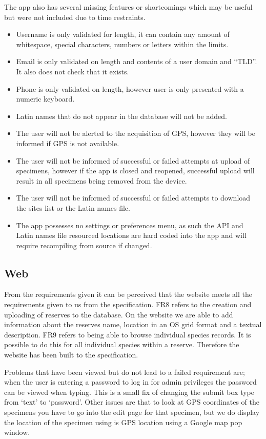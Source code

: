     The app also has several missing features or shortcomings which may be useful but were not included due to time restraints. 
    \begin{itemize}
        \item Username is only validated for length, it can contain any amount of whitespace, special characters, numbers or letters within the limits.
        \item Email is only validated on length and contents of a user domain and ``TLD''. It also does not check that it exists.
        \item Phone is only validated on length, however user is only presented with a numeric keyboard.
        \item Latin names that do not appear in the database will not be added.
        \item The user will not be alerted to the acquisition of GPS, however they will be informed if GPS is not available. 
        \item The user will not be informed of successful or failed attempts at upload of specimens, however if the app is closed and reopened, successful upload will result in all specimens being removed from the device. 
        \item The user will not be informed of successful or failed attempts to download the sites list or the Latin names file.
        \item The app possesses no settings or preferences menu, as such the API and Latin names file resourced locations are hard coded into the app and will require recompiling from source if changed.
    \end{itemize}

\subsection{Web}
    From the requirements given it can be perceived that the website meets all the requirements given to us from the specification. FR8 refers to the creation and uploading of reserves to the database. On the website we are able to add information about the reserves name, location in an OS grid format and a textual description. FR9 refers to being able to browse individual species records. It is possible to do this for all individual species within a reserve. Therefore the website has been built to the specification.

    Problems that have been viewed but do not lead to a failed requirement are; when the user is entering a password to log in for admin privileges the password can be viewed when typing. This is a small fix of changing the submit box type from `text' to `password'. Other issues are that to look at GPS coordinates of the specimens you have to go into the edit page for that specimen, but we do display the location of the specimen using is GPS location using a Google map pop window.

